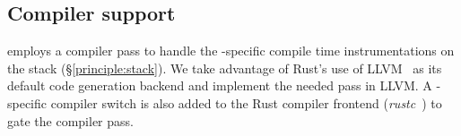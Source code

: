 \subsection{Compiler support}
\label{impl:compiler}
\projname{} employs a compiler pass to handle the \projname{}-specific
    compile time instrumentations on the stack (\S\ref{principle:stack}).
We take advantage of Rust's use of LLVM~\cite{llvm} as its default code
    generation backend and implement the needed pass in LLVM.
A \projname{}-specific compiler switch is also added to the Rust compiler
    frontend (\emph{rustc}~\cite{rustc}) to gate the \projname{} compiler pass.
